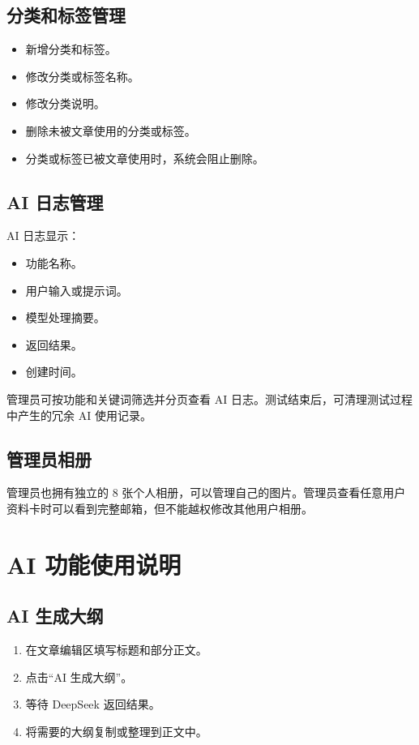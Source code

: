 \documentclass[UTF8,a4paper,12pt]{ctexart}
\begin{document}
\subsection{分类和标签管理}

\begin{itemize}
  \item 新增分类和标签。
  \item 修改分类或标签名称。
  \item 修改分类说明。
  \item 删除未被文章使用的分类或标签。
  \item 分类或标签已被文章使用时，系统会阻止删除。
\end{itemize}

\subsection{AI 日志管理}

AI 日志显示：

\begin{itemize}
  \item 功能名称。
  \item 用户输入或提示词。
  \item 模型处理摘要。
  \item 返回结果。
  \item 创建时间。
\end{itemize}

管理员可按功能和关键词筛选并分页查看 AI 日志。测试结束后，可清理测试过程中产生的冗余 AI 使用记录。

\subsection{管理员相册}

管理员也拥有独立的 8 张个人相册，可以管理自己的图片。管理员查看任意用户资料卡时可以看到完整邮箱，但不能越权修改其他用户相册。

\section{AI 功能使用说明}

\subsection{AI 生成大纲}

\begin{enumerate}
  \item 在文章编辑区填写标题和部分正文。
  \item 点击“AI 生成大纲”。
  \item 等待 DeepSeek 返回结果。
  \item 将需要的大纲复制或整理到正文中。
\end{enumerate}
\end{document}
